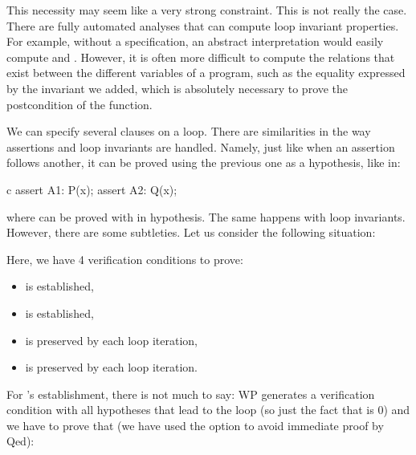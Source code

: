 


\begin{Information}
  This necessity may seem like a very strong constraint. This is not really the
  case. There are fully automated analyses that can compute loop
  invariant properties. For example, without a specification, an abstract
  interpretation would easily compute 
  and .
  However, it is often more difficult to compute the relations
  that exist between the different variables of a program, such
  as the equality expressed by the invariant we
  added, which is absolutely necessary to prove the postcondition of the
  function.
\end{Information}


\label{l3:statements-loops-multi-inv}

We can specify several  clauses on a loop. There are
similarities in the way assertions and loop invariants are handled. Namely, just
like when an assertion follows another, it can be proved using the previous one
as a hypothesis, like in:
\begin{CodeBlock}{c}
assert A1: P(x);
assert A2: Q(x);
\end{CodeBlock}
where  can be proved with  in hypothesis. The same
happens with loop invariants. However, there are some subtleties. Let us
consider the following situation:




Here, we have 4 verification conditions to prove:
\begin{itemize}
  \item {} is established,
  \item {} is established,
  \item {} is preserved by each loop iteration,
  \item {} is preserved by each loop iteration.
\end{itemize}
For 's establishment, there is not much to say: WP generates a
verification condition with all hypotheses that lead to the loop (so just the
fact that  is 0) and we have to prove that 
(we have used the option  to avoid immediate proof by
Qed):


